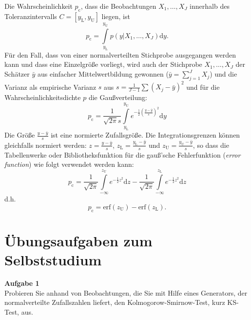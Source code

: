Die Wahrscheinlichkeit $p_\mathrm{c}$, dass die Beobachtungen ${X_1,\dots,X_J}$ innerhalb des Toleranzintervalls
$C = [y_\mathrm{L}, y_\mathrm{U}]$ liegen, ist
\begin{equation}
	p_\mathrm{c} =  \int\limits_{y_\mathrm{L}}^{y_\mathrm{U}} p(y|{X_1,\dots,X_J}) \mathrm{d}y.
\end{equation}
Für den Fall, dass von einer normalverteilten Stichprobe ausgegangen werden kann und dass eine Einzelgröße
vorliegt, wird auch der Stichprobe ${X_1,\dots,X_J}$ der Schätzer $\bar y$ aus einfacher Mittelwertbildung
gewonnen ($\bar y = \sum_{j=1}^J X_j$) und die Varianz als empirische Varianz $s$ aus
$s = \frac{1}{J-1}\sum (X_j - \bar y)^2$ und für die Wahrscheinlichkeitsdichte $p$ die Gaußverteilung:
\begin{equation}
	p_\mathrm{c} = \frac{1}{\sqrt{2 \pi} s} \int\limits_{y_\mathrm{L}}^{y_\mathrm{U}} 
	e^{-\frac{1}{2}\left(\frac{y - \bar y}{s}\right)^2} \mathrm{d}y
\end{equation}
Die Größe $\frac{y - \bar y}{s}$ ist eine normierte Zufallsgröße. Die Integrationsgrenzen können gleichfalls
normiert werden: $z = \frac{y - \bar y}{s}$, $z_\mathrm{L} = \frac{y_\mathrm{L} - \bar y}{s}$ und
$z_\mathrm{U} = \frac{y_\mathrm{U} - \bar y}{s}$, so dass die Tabellenwerke oder Bibliotheksfunktion
für die gauß'sche Fehlerfunktion (\textsl{error function}) wie folgt verwendet werden kann:
\begin{equation}
p_\mathrm{c} = \frac{1}{\sqrt{2 \pi}} \int\limits_{-\infty}^{z_\mathrm{U}} 
	e^{-\frac{1}{2} z^2} \mathrm{d}z - 
	\frac{1}{\sqrt{2 \pi}} \int\limits_{-\infty}^{z_\mathrm{L}} e^{-\frac{1}{2} z^2} \mathrm{d}z
\end{equation}
d.h.
\begin{equation}
	p_\mathrm{c} = \mathrm{erf}(z_\mathrm{U}) - \mathrm{erf}(z_\mathrm{L}).
\end{equation}


%
%


\section{Übungsaufgaben zum Selbststudium}
\label{AufgVorl5}

\textbf{Aufgabe 1}\\

Probieren Sie anhand von Beobachtungen, die Sie mit Hilfe eines Generators, der
normalverteilte Zufallszahlen liefert, den Kolmogorow-Smirnow-Test, kurz KS-Test, aus.

